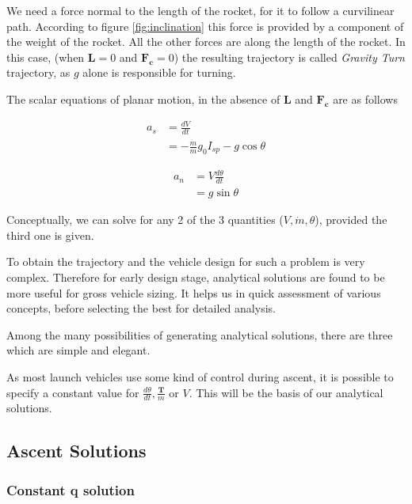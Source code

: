 \documentclass{article}
\theoremstyle{definition}
\begin{document}
We need a force normal to the length of the rocket, for it to follow a curvilinear path. 
According to figure \ref{fig:inclination} this force is provided by a component of the weight of the rocket. All the other forces are along the length of the rocket.
In this case, (when $\boldsymbol{L} = 0$ and $\boldsymbol{F_c} = 0$) the resulting trajectory is called \emph{Gravity Turn} trajectory, as $g$ alone is responsible for turning.

The scalar equations of planar motion, in the absence of $\boldsymbol{L}$ and $\boldsymbol{F_c}$ are as follows 

\begin{equation}\label{motion1}
\begin{split}
    a_s & = \frac{dV}{dt}\\
    & = - \frac{\Dot{m}}{m} g_0 I_{sp} - g \cos{\theta}
\end{split}   
\end{equation}

\begin{equation}\label{motion2}
\begin{split}
   a_n & = V \frac{d\theta}{dt}\\
   & = g \sin{\theta}
\end{split}   
\end{equation}


Conceptually, we can solve for any 2 of the 3 quantities ($V, \Dot{m}, \theta$), provided the third one is given.

To obtain the trajectory and the vehicle design for such a problem is very complex. Therefore for early design stage, analytical solutions are found to be more useful for gross vehicle sizing. 
It helps us in quick assessment of various concepts, before selecting the best for detailed analysis. \medskip

Among the many possibilities of generating analytical solutions, there are three which are simple and elegant. 

As most launch vehicles use some kind of control during ascent, it is possible to specify a constant value for $\frac{d\theta}{dt}, \frac{\boldsymbol{T}}{m}$ or $V$. This will be the basis of our analytical solutions. 

\subsection{Ascent Solutions}

\subsubsection{Constant q solution}
\end{document}
